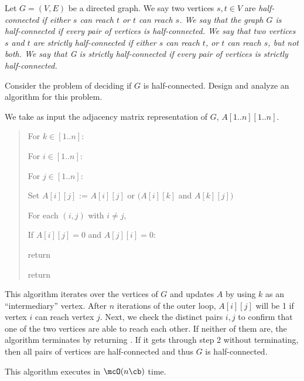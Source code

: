 \documentclass{article}
\begin{document}
 Let \( G = (V, E) \) be a directed graph. We say two vertices \( s, t \in V \) are \it{half-connected} if either \( s \) can reach \( t \) or \( t \) can reach \( s \).
We say that the graph \( G \) is \it{half-connected} if every pair of vertices is half-connected.
We say that two vertices \( s \) and \( t \) are \it{strictly half-connected} if either \( s \) can reach \( t \), or \( t \) can reach \( s \), but not both.
We say that G is \it{strictly half-connected} if every pair of vertices is strictly half-connected.
\setcounter{section}{6}
\setcounter{exercise}{5}
\begin{subexercise}
Consider the problem of deciding if \( G \) is half-connected.
Design and analyze an algorithm for this problem.
\end{subexercise}

\begin{solution}
We take as input the adjacency matrix representation of \( G \), \( A[1..n][1..n] \).
\begin{quote}
\begin{steps}
  \item For \( k\in [1..n] \): \begin{steps}
    \item For \( i\in [1..n] \): \begin{steps}
      \item For \( j\in [1..n] \): \begin{steps}
        \item Set \( A[i][j] \) := \( A[i][j] \) or \( (A[i][k] \) and \( A[k][j]) \)
      \end{steps}
    \end{steps}
  \end{steps}
  \item For each \( (i,j) \) with \( i\neq j \), \begin{steps}
    \item If \( A[i][j] = 0 \) and \( A[j][i] = 0 \): \begin{steps}
      \item return \boolF
    \end{steps}
  \end{steps}
  \item return \boolT
\end{steps}
\end{quote}
This algorithm iterates over the vertices of \( G \) and updates \( A \) by using \( k \) as an ``intermediary'' vertex.
After \( n \) iterations of the outer loop, \( A[i][j] \) will be 1 if vertex \( i \) can reach vertex \( j \).
Next, we check the distinct pairs \( i,j \) to confirm that one of the two vertices are able to reach each other.
If neither of them are, the algorithm terminates by returning \boolF.
If it gets through step 2 without terminating, then all pairs of vertices are half-connected and thus \( G \) is half-connected.

This algorithm executes in \( \mcO(n\cb) \) time.
\end{solution}
\pagebreak
\end{document}
